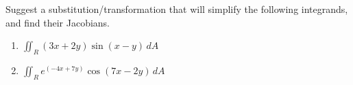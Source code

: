 Suggest a substitution/transformation that will simplify the following integrands, and find their Jacobians.

\begin{enumerate}[label=(\alph*), itemsep=0.4em, topsep=0.5em]
	\item $\displaystyle \iint_R (3x + 2y) \sin(x - y)\, dA$
	\item $\displaystyle \iint_R e^{(-4x + 7y)} \cos(7x - 2y)\, dA$
\end{enumerate}